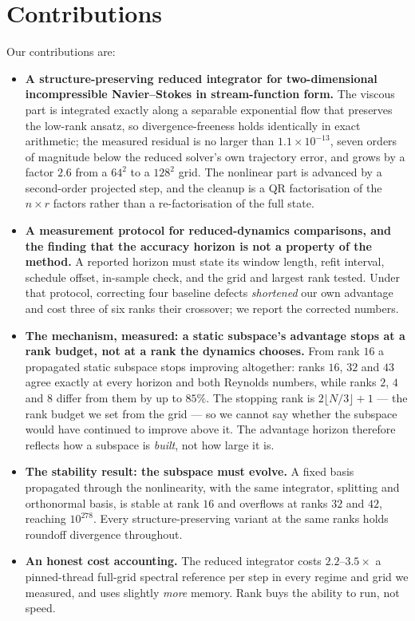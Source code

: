 
\section{Contributions}
\label{sec:contributions}

Our contributions are:

\begin{itemize}
\item \textbf{A structure-preserving reduced integrator for two-dimensional
incompressible Navier--Stokes in stream-function form.} The viscous part is
integrated exactly along a separable exponential flow that preserves the low-rank
ansatz, so divergence-freeness holds identically in exact arithmetic; the measured
residual is no larger than $1.1\times 10^{-13}$, seven orders of magnitude below
the reduced solver's own trajectory error, and grows by a factor $2.6$ from a
$64^2$ to a $128^2$ grid. The nonlinear part is advanced by a second-order
projected step, and the cleanup is a QR factorisation of the $n\times r$ factors
rather than a re-factorisation of the full state.

\item \textbf{A measurement protocol for reduced-dynamics comparisons, and the
finding that the accuracy horizon is not a property of the method.} A reported
horizon must state its window length, refit interval, schedule offset, in-sample
check, and the grid and largest rank tested. Under that protocol, correcting four
baseline defects \emph{shortened} our own advantage and cost three of six ranks
their crossover; we report the corrected numbers.

\item \textbf{The mechanism, measured: a static subspace's advantage stops at a rank budget, not at a rank the dynamics
chooses.} From rank $16$ a propagated static subspace stops improving altogether: ranks $16$, $32$ and $43$
agree exactly at every horizon and both Reynolds numbers, while ranks $2$, $4$ and $8$
differ from them by up to $85\%$. The stopping rank is $2\lfloor N/3\rfloor+1$ --- the rank budget we set from
the grid --- so we cannot say whether the subspace would have continued to improve above it. The
advantage horizon therefore reflects how a subspace is \emph{built}, not how large it is.

\item \textbf{The stability result: the subspace must evolve.} A fixed basis
propagated through the nonlinearity, with the same integrator, splitting and
orthonormal basis, is stable at rank $16$ and overflows at ranks $32$ and $42$,
reaching $10^{278}$. Every structure-preserving variant at the same ranks holds
roundoff divergence throughout.

\item \textbf{An honest cost accounting.} The reduced integrator costs
$2.2$--$3.5\times$ a pinned-thread full-grid spectral reference per step in every
regime and grid we measured, and uses slightly \emph{more} memory. Rank buys the
ability to run, not speed.
\end{itemize}

